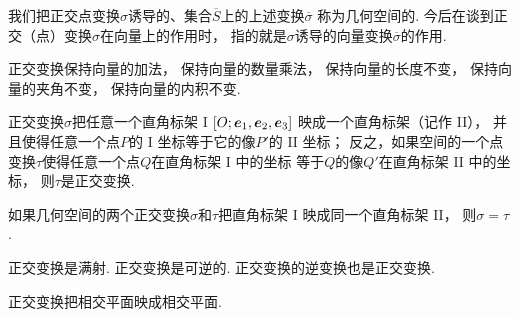 我们把正交点变换\(\sigma\)诱导的、集合\(\overline{S}\)上的上述变换\(\overline{\sigma}\)
称为几何空间的.
今后在谈到正交（点）变换\(\sigma\)在向量上的作用时，
指的就是\(\sigma\)诱导的向量变换\(\overline{\sigma}\)的作用.

\begin{property}
正交变换保持向量的加法，
保持向量的数量乘法，
保持向量的长度不变，
保持向量的夹角不变，
保持向量的内积不变.
\end{property}

\begin{theorem}
正交变换\(\sigma\)把任意一个直角标架 I \([O;\boldsymbol{e}_1,\boldsymbol{e}_2,\boldsymbol{e}_3]\)
映成一个直角标架（记作 II），
并且使得任意一个点\(P\)的 I 坐标等于它的像\(P'\)的 II 坐标；
反之，如果空间的一个点变换\(\tau\)使得任意一个点\(Q\)在直角标架 I 中的坐标
等于\(Q\)的像\(Q'\)在直角标架 II 中的坐标，
则\(\tau\)是正交变换.
\end{theorem}

\begin{corollary}
如果几何空间的两个正交变换\(\sigma\)和\(\tau\)把直角标架 I 映成同一个直角标架 II，
则\(\sigma = \tau\).
\end{corollary}

\begin{property}
正交变换是满射.
正交变换是可逆的.
正交变换的逆变换也是正交变换.
\end{property}

\begin{property}
正交变换把相交平面映成相交平面.
\end{property}


